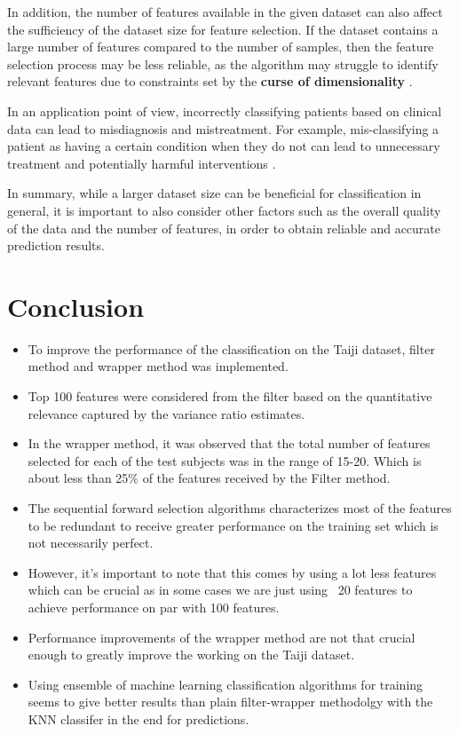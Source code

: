 \documentclass[12pt,twoside,a4paper]{article}
\begin{document}
In addition, the number of features available in the given dataset can also affect the sufficiency of the dataset size for feature selection. If the dataset contains a large number of features compared to the number of samples, then the feature selection process may be less reliable, as the algorithm may struggle to identify relevant features due to constraints set by the \textbf{curse of dimensionality} \cite{ChrisPRML}.

In an application point of view, incorrectly classifying patients based on clinical data can lead to misdiagnosis and mistreatment. For example, mis-classifying a patient as having a certain condition when they do not can lead to unnecessary treatment and potentially harmful interventions \cite{Ladha2015}.

In summary, while a larger dataset size can be beneficial for classification in general, it is important to also consider other factors such as the overall quality of the data and the number of features, in order to obtain reliable and accurate prediction results.
\section{Conclusion}

\begin{itemize}
    \item To improve the performance of the classification on the Taiji dataset, filter method and wrapper method was implemented.
    \item Top 100 features were considered from the filter based on the quantitative relevance captured by the variance ratio estimates.
    \item In the wrapper method, it was observed that the total number of features selected for each of the test subjects was in the range of 15-20. Which is about less than 25\% of the features received by the Filter method.
    \item The sequential forward selection algorithms characterizes most of the features to be redundant to receive greater performance on the training set which is not necessarily perfect.
    \item However, it’s important to note that this comes by using a lot less features which can be crucial as in some cases we are just using ~20 features to achieve performance on par with 100 features.
    \item Performance improvements of the wrapper method are not that crucial enough to greatly improve the working on the Taiji dataset.
    \item Using ensemble of machine learning classification algorithms for training seems to give better results than plain filter-wrapper methodolgy with the KNN classifer in the end for predictions. 
\end{itemize}


{\small

}
\end{document}

